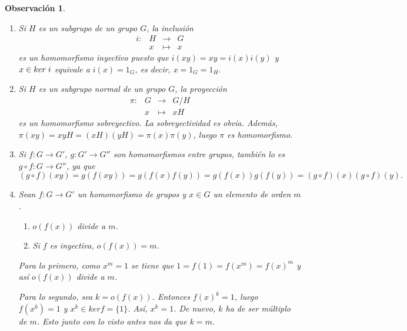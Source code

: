 \documentclass[12pt]{article}
\newtheorem{observation}{Observación}[theorem]
\begin{document}
\begin{observation}
\begin{enumerate}
En efecto, si $x,y \in f^{-1}(H')$, entonces $f(x),f(y) \in H'$, de donde $f(xy^{-1}) = f(x)f(y)^{-1} \in H'$, luego $xy^{-1} \in f^{-1}(H')$. Para probar la normalidad de $f^{-1}(H')$ usamos la condición $(3)$ de~\ref{prop:gruNo}: Si $ab \in f^{-1}(H')$ se sigue que $f(a)f(b) = f(ab) \in H'$ y como $H'$ es normal, $f(ba) = f(b)f(a) \in H'.$ Por lo tanto $ba \in f^{-1}(H').$

Observemos que $ker f = f^{-1}(\lbrace 1_{G'} \rbrace )$.

\item Si $H$ es un subgrupo de un grupo $G$, la inclusión $$\begin{array}{rccl}
i\colon &H& \longrightarrow &G\\
&x& \longmapsto &x
\end{array}
$$ es un homomorfismo inyectivo puesto que $i(xy)= xy = i(x)i(y)$ y $x \in ker\hspace{0.1cm} i$ equivale a $i(x) = 1_G$, es decir, $x = 1_G = 1_H.$
\item Si $H$ es un subgrupo normal de un grupo $G$, la proyección  $$\begin{array}{rccl}
\pi\colon &G& \longrightarrow &G/H\\
&x& \longmapsto &xH
\end{array}
$$ es un homomorfismo sobreyectivo. La sobreyectividad es obvia. Además, $\pi (xy) = xyH = (xH)(yH)= \pi(x) \pi(y)$, luego $\pi$ es homomorfismo.
\item Si $f\colon G \longrightarrow  G'$, $g\colon G' \longrightarrow  G''$ son homomorfismos entre grupos, también lo es $g\circ f\colon G \longrightarrow G''$, ya que
$$ (g \circ f)(xy) = g(f(xy)) = g(f(x)f(y)) = g(f(x))g(f(y)) = (g \circ f)(x) (g \circ f)(y).$$
\item Sean $f\colon G \longrightarrow G'$ un homomorfismo de grupos y $x\in G$ un elemento de orden $m$.
\begin{enumerate}
\item $o(f(x))$ divide a $m$.
\item Si $f$ es inyectiva, $o(f(x)) = m$.
\end{enumerate} 

Para lo primero, como $x^{m} = 1$ se tiene que $1 = f(1) = f(x^{m}) = f(x)^{m}$ y así $o(f(x))$ divide a $m$. 

Para lo segundo, sea $k = o(f(x))$. Entonces $f(x)^k = 1$, luego $f(x^k) = 1$ y $x^k \in ker f = \lbrace 1 \rbrace$. Así, $x^k = 1$. De nuevo, $k$ ha de ser múltiplo de $m$. Esto junto con lo visto antes nos da que $k=m$.


\end{enumerate}
\end{observation}
\end{document}
